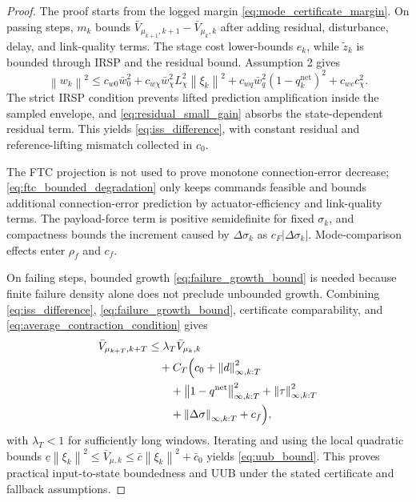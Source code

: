 \documentclass[letterpaper,journal]{IEEEtran}
\newcommand{\norm}[1]{\left\lVert #1 \right\rVert}
\begin{document}
\begin{proof}
The proof starts from the logged margin \eqref{eq:mode_certificate_margin}. On passing steps, $m_k$ bounds $\bar V_{\mu_{k+1},k+1}-\bar V_{\mu_k,k}$ after adding residual, disturbance, delay, and link-quality terms. The stage cost lower-bounds $e_k$, while $\tilde z_k$ is bounded through IRSP and the residual bound. Assumption 2 gives
\begin{equation}
\norm{w_k}^2
\le c_{w0}\bar w_0^2+c_{w\chi}\bar w_\chi^2L_\chi^2\norm{\xi_k}^2
+c_{wq}\bar w_q^2(1-q_k^{\mathrm{net}})^2+c_{wc}c_\chi^2 .
\label{eq:residual_absorption}
\end{equation}
The strict IRSP condition prevents lifted prediction amplification inside the sampled envelope, and \eqref{eq:residual_small_gain} absorbs the state-dependent residual term. This yields \eqref{eq:iss_difference}, with constant residual and reference-lifting mismatch collected in $c_0$.

The FTC projection is not used to prove monotone connection-error decrease; \eqref{eq:ftc_bounded_degradation} only keeps commands feasible and bounds additional connection-error prediction by actuator-efficiency and link-quality terms. The payload-force term is positive semidefinite for fixed $\sigma_k$, and compactness bounds the increment caused by $\Delta\sigma_k$ as $c_F|\Delta\sigma_k|$. Mode-comparison effects enter $\rho_f$ and $c_f$.

On failing steps, bounded growth \eqref{eq:failure_growth_bound} is needed because finite failure density alone does not preclude unbounded growth. Combining \eqref{eq:iss_difference}, \eqref{eq:failure_growth_bound}, certificate comparability, and \eqref{eq:average_contraction_condition} gives
\begingroup\small
\begin{equation}
\begin{aligned}
\bar V_{\mu_{k+T},k+T}
&\le \lambda_T\bar V_{\mu_k,k}\\
&\quad +C_T\Bigl(c_0+\norm{d}_{\infty,k:T}^2\\
&\qquad +\norm{1-q^{\mathrm{net}}}_{\infty,k:T}^2
+\norm{\tau}_{\infty,k:T}^2\\
&\qquad +\norm{\Delta\sigma}_{\infty,k:T}+c_f\Bigr),
\end{aligned}
\label{eq:window_comparison}
\end{equation}
\endgroup
with $\lambda_T<1$ for sufficiently long windows. Iterating and using the local quadratic bounds
$\underline c\norm{\xi_k}^2\le\bar V_{\mu,k}\le\bar c\norm{\xi_k}^2+\bar c_0$ yields \eqref{eq:uub_bound}. This proves practical input-to-state boundedness and UUB under the stated certificate and fallback assumptions.
\end{proof}
\end{document}
